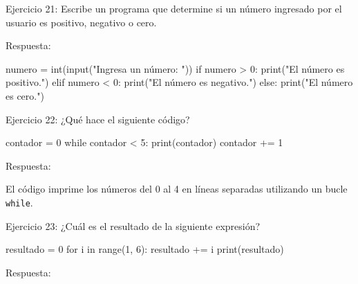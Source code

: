 \documentclass[
  a4paper,
  onepage,
  openany]{scrreprt}
\newenvironment{Shaded}{\begin{snugshade}}{\end{snugshade}}
\newcommand{\BuiltInTok}[1]{\textcolor[rgb]{0.00,0.23,0.31}{#1}}
\newcommand{\ControlFlowTok}[1]{\textcolor[rgb]{0.00,0.23,0.31}{#1}}
\newcommand{\DecValTok}[1]{\textcolor[rgb]{0.68,0.00,0.00}{#1}}
\newcommand{\KeywordTok}[1]{\textcolor[rgb]{0.00,0.23,0.31}{#1}}
\newcommand{\NormalTok}[1]{\textcolor[rgb]{0.00,0.23,0.31}{#1}}
\newcommand{\OperatorTok}[1]{\textcolor[rgb]{0.37,0.37,0.37}{#1}}
\newcommand{\StringTok}[1]{\textcolor[rgb]{0.13,0.47,0.30}{#1}}
\begin{document}
Ejercicio 21: Escribe un programa que determine si un número ingresado
por el usuario es positivo, negativo o cero.

Respuesta:

\begin{Shaded}
\begin{Highlighting}[]
\NormalTok{numero }\OperatorTok{=} \BuiltInTok{int}\NormalTok{(}\BuiltInTok{input}\NormalTok{(}\StringTok{"Ingresa un número: "}\NormalTok{))}
\ControlFlowTok{if}\NormalTok{ numero }\OperatorTok{\textgreater{}} \DecValTok{0}\NormalTok{:}
    \BuiltInTok{print}\NormalTok{(}\StringTok{"El número es positivo."}\NormalTok{)}
\ControlFlowTok{elif}\NormalTok{ numero }\OperatorTok{\textless{}} \DecValTok{0}\NormalTok{:}
    \BuiltInTok{print}\NormalTok{(}\StringTok{"El número es negativo."}\NormalTok{)}
\ControlFlowTok{else}\NormalTok{:}
    \BuiltInTok{print}\NormalTok{(}\StringTok{"El número es cero."}\NormalTok{)}
\end{Highlighting}
\end{Shaded}

Ejercicio 22: ¿Qué hace el siguiente código?

\begin{Shaded}
\begin{Highlighting}[]
\NormalTok{contador }\OperatorTok{=} \DecValTok{0}
\ControlFlowTok{while}\NormalTok{ contador }\OperatorTok{\textless{}} \DecValTok{5}\NormalTok{:}
    \BuiltInTok{print}\NormalTok{(contador)}
\NormalTok{    contador }\OperatorTok{+=} \DecValTok{1}
\end{Highlighting}
\end{Shaded}

Respuesta:

El código imprime los números del 0 al 4 en líneas separadas utilizando
un bucle \texttt{while}.

Ejercicio 23: ¿Cuál es el resultado de la siguiente expresión?

\begin{Shaded}
\begin{Highlighting}[]
\NormalTok{resultado }\OperatorTok{=} \DecValTok{0}
\ControlFlowTok{for}\NormalTok{ i }\KeywordTok{in} \BuiltInTok{range}\NormalTok{(}\DecValTok{1}\NormalTok{, }\DecValTok{6}\NormalTok{):}
\NormalTok{    resultado }\OperatorTok{+=}\NormalTok{ i}
\BuiltInTok{print}\NormalTok{(resultado)}
\end{Highlighting}
\end{Shaded}

Respuesta:
\end{document}
